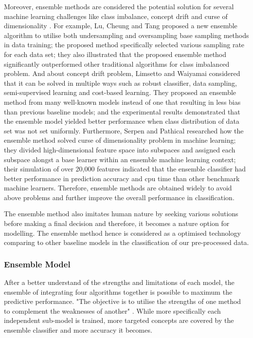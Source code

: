 \documentclass[10pt,journal,compsoc]{IEEEtran}
\begin{document}
Moreover, ensemble methods are considered the potential solution for several machine learning challenges like class imbalance, concept drift and curse of dimensionality \cite{Sagi}. For example, Lu, Cheung and Tang \cite{Lu} proposed a new ensemble algorithm to utilise both undersampling and oversampling base sampling methods in data training; the proposed method specifically selected various sampling rate for each data set; they also illustrated that the proposed ensemble method significantly outperformed other traditional algorithms for class imbalanced problem. And about concept drift problem, Limsetto and Waiyamai \cite{Limsetto} considered that it can be solved in multiple ways such as robust classifier, data sampling, semi-supervised learning and cost-based learning. They proposed an ensemble method from many well-known models instead of one that resulting in less bias than previous baseline models; and the experimental results demonstrated that the ensemble model yielded better performance when class distribution of data set was not set uniformly. Furthermore, Serpen and Pathical \cite{Serpen} researched how the ensemble method solved curse of dimensionality problem in machine learning; they divided high-dimensional feature space into subspaces and assigned each subspace alongst a base learner within an ensemble machine learning context; their simulation of over 20,000 features indicated that the ensemble classifier had better performance in prediction accuracy and cpu time than other benchmark machine learners. Therefore, ensemble methods are obtained widely to avoid above problems and further improve the overall performance in classification.

The ensemble method also imitates human nature by seeking various solutions before making a final decision \cite{Sagi} and therefore, it becomes a nature option for modelling. The ensemble method hence is considered as a optimised technology comparing to other baseline models in the classification of our pre-processed data.
%
%
\subsubsection{Ensemble Model}
After a better understand of the strengths and limitations of each model, the ensemble of integrating four algorithms together is possible to maximum the predictive performance. "The objective is to utilise the strengths of one method to complement the weaknesses of another" \cite{Kotsiantis}. While more specifically each independent sub-model is trained, more targeted concepts are covered by the ensemble classifier and more accuracy it becomes. 
\end{document}
